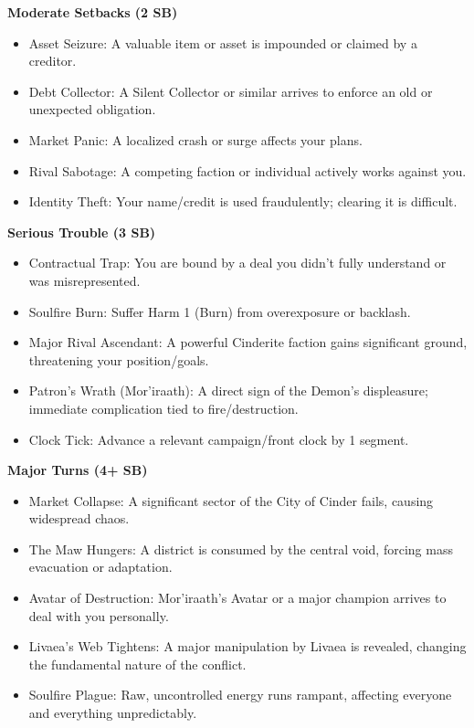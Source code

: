\documentclass[11pt,letterpaper]{article}
\begin{document}
\textbf{Moderate Setbacks (2 SB)}
\begin{itemize}[leftmargin=*]
    \item Asset Seizure: A valuable item or asset is impounded or claimed by a creditor.
    \item Debt Collector: A Silent Collector or similar arrives to enforce an old or unexpected obligation.
    \item Market Panic: A localized crash or surge affects your plans.
    \item Rival Sabotage: A competing faction or individual actively works against you.
    \item Identity Theft: Your name/credit is used fraudulently; clearing it is difficult.
\end{itemize}

\textbf{Serious Trouble (3 SB)}
\begin{itemize}[leftmargin=*]
    \item Contractual Trap: You are bound by a deal you didn't fully understand or was misrepresented.
    \item Soulfire Burn: Suffer Harm 1 (Burn) from overexposure or backlash.
    \item Major Rival Ascendant: A powerful Cinderite faction gains significant ground, threatening your position/goals.
    \item Patron's Wrath (Mor'iraath): A direct sign of the Demon's displeasure; immediate complication tied to fire/destruction.
    \item Clock Tick: Advance a relevant campaign/front clock by 1 segment.
\end{itemize}

\textbf{Major Turns (4+ SB)}
\begin{itemize}[leftmargin=*]
    \item Market Collapse: A significant sector of the City of Cinder fails, causing widespread chaos.
    \item The Maw Hungers: A district is consumed by the central void, forcing mass evacuation or adaptation.
    \item Avatar of Destruction: Mor'iraath's Avatar or a major champion arrives to deal with you personally.
    \item Livaea's Web Tightens: A major manipulation by Livaea is revealed, changing the fundamental nature of the conflict.
    \item Soulfire Plague: Raw, uncontrolled energy runs rampant, affecting everyone and everything unpredictably.
\end{itemize}
\end{document}
